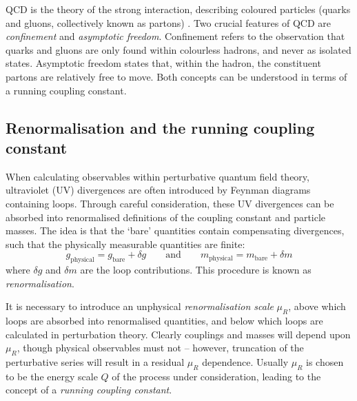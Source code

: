 
\ac{QCD} is the theory of the strong interaction, describing coloured particles (quarks 
and gluons, collectively known as partons) \cite{Ellis:1996}. Two crucial features of 
\ac{QCD} are \textit{confinement} and \textit{asymptotic freedom}. Confinement refers to 
the observation that quarks and gluons are only found within colourless hadrons, and 
never as isolated states. Asymptotic freedom states that, within the hadron, the 
constituent partons are relatively free to move. Both concepts can be understood in terms 
of a running coupling constant.



\subsection{Renormalisation and the running coupling constant}
\label{sec:qcd:renormalisation}

When calculating observables within perturbative quantum field theory, ultraviolet (UV) 
divergences are often introduced by Feynman diagrams containing loops. Through careful 
consideration, these UV divergences can be absorbed into renormalised definitions of the 
coupling constant and particle masses. The idea is that the `bare' quantities contain 
compensating divergences, such that the physically measurable quantities are finite:
\begin{equation}
	g_{\text{physical}} = g_{\text{bare}} + \delta g
	\quad\quad\text{and}\quad\quad
	m_{\text{physical}} = m_{\text{bare}} + \delta m
\end{equation}
where $\delta g$ and $\delta m$ are the loop contributions. This procedure is known as 
\textit{renormalisation}.

It is necessary to introduce an unphysical \textit{renormalisation scale} $\mu_R$, above 
which loops are absorbed into renormalised quantities, and below which loops are 
calculated in perturbation theory. Clearly couplings and masses will depend upon $\mu_R$,
though physical observables must not -- however, truncation of the perturbative series 
will result in a residual $\mu_R$ dependence. Usually $\mu_R$ is chosen to be the energy 
scale $Q$ of the process under consideration, leading to the concept of a \textit{running 
coupling constant}.

